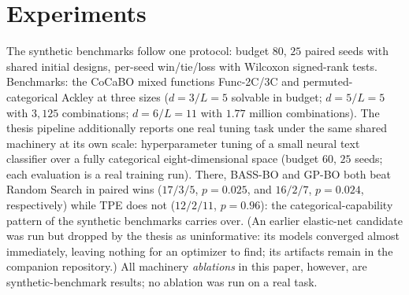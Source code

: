 \documentclass[%
 aip,
 amsmath,amssymb,
 floatfix,
 reprint,%
]{revtex4-1}
\begin{document}
\section{Experiments}

\label{sec:experiments}

The synthetic benchmarks follow one protocol: budget $80$, $25$ paired
seeds with shared initial designs, per-seed win/tie/loss with Wilcoxon
signed-rank tests. Benchmarks: the CoCaBO mixed functions Func-2C/3C
\cite{ru2020cocabo} and permuted-categorical Ackley at three sizes
($d{=}3/L{=}5$ solvable in budget; $d{=}5/L{=}5$ with $3{,}125$
combinations; $d{=}6/L{=}11$ with
$1.77$ million combinations). The thesis pipeline additionally reports
one real tuning task under the same shared machinery at its own scale:
hyperparameter tuning of a small neural text classifier over a fully
categorical eight-dimensional space (budget $60$, $25$ seeds; each
evaluation is a real training run). There, BASS-BO and GP-BO both beat
Random Search in paired wins ($17/3/5$, $p = 0.025$, and $16/2/7$,
$p = 0.024$, respectively) while TPE does not ($12/2/11$, $p = 0.96$):
the categorical-capability pattern of the synthetic benchmarks carries
over. (An earlier elastic-net candidate was run but dropped by the
thesis as uninformative: its models converged almost immediately,
leaving nothing for an optimizer to find; its artifacts remain in the
companion repository.) All machinery \emph{ablations} in this paper,
however, are synthetic-benchmark results; no ablation was run on a real
task.
\end{document}
